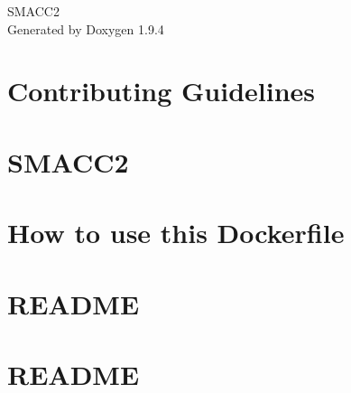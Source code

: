 \documentclass[twoside]{book}
\newcommand{\+}{\discretionary{\mbox{\scriptsize$\hookleftarrow$}}{}{}}
\newcommand{\clearemptydoublepage}{%
    \newpage{\pagestyle{empty}\cleardoublepage}%
  }
\begin{document}
  \raggedbottom
    \hypersetup{pageanchor=false,
                bookmarksnumbered=true,
                pdfencoding=unicode
               }
  \begin{titlepage}
  \vspace*{7cm}
  \begin{center}%
  {\Large SMACC2}\\
  \vspace*{1cm}
  {\large Generated by Doxygen 1.9.4}\\
  \end{center}
  \end{titlepage}
  \clearemptydoublepage
  \tableofcontents
  \clearemptydoublepage
  \hypersetup{pageanchor=true}
\chapter{Contributing Guidelines}
\label{md_CONTRIBUTING}

\chapter{SMACC2}
\label{md_README}

\chapter{How to use this Dockerfile}
\label{md_smacc2_ci_docker_ros_rollingAndGalactic_ubuntu_20_04_README}

\chapter{README}
\label{md_smacc2_performance_tools__smacc2_sm_template_README}

\chapter{README}
\label{md_smacc2_performance_tools_performance_tests_sm_atomic_performance_trace_1_README}

\end{document}
